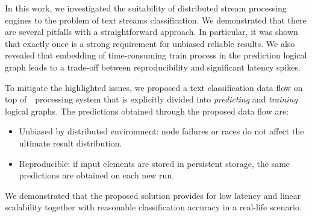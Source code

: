 \label {fs-short-conclusion}

In this work, we investigated the suitability of distributed stream processing engines to the problem of text streams classification. We demonstrated that there are several pitfalls with a straightforward approach. In particular, it was shown that exactly once is a strong requirement for unbiased reliable results. We also revealed that embedding of time-consuming train process in the prediction logical graph leads to a trade-off between reproducibility and significant latency spikes. 

To mitigate the highlighted issues, we proposed a text classification data flow on top of~\FlameStream\ processing system that is explicitly divided into {\em predicting} and {\em training} logical graphs. The predictions obtained through the proposed data flow are:

\begin{itemize}
    \item Unbiased by distributed environment: node failures or races do not affect the ultimate result distribution.
    \item Reproducible: if input elements are stored in persistent storage, the same predictions are obtained on each new run.
\end{itemize}

We demonstrated that the proposed solution provides for low latency and linear scalability together with reasonable classification accuracy in a real-life scenario.